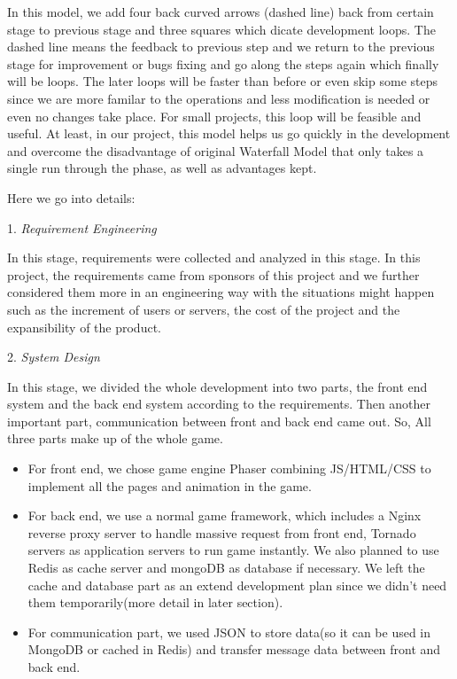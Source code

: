 \documentclass[a4paper,11pt]{article}
\begin{document}
In this model, we add four back curved arrows (dashed line) back from certain stage to previous stage and three squares which dicate development loops. The dashed line means the feedback to previous step and we return to the previous stage for improvement or bugs fixing and go along the steps again which finally will be loops. The later loops will be faster than before or even skip some steps since we are more familar to the operations and less modification is needed or even no changes take place. For small projects, this loop will be feasible and useful. At least, in our project, this model helps us go quickly in the development and overcome the disadvantage of original Waterfall Model that only takes a single run through the phase, as well as advantages kept.

 Here we go into details:

1.	\emph{Requirement Engineering}

In this stage, requirements were collected and analyzed in this stage. In this project, the requirements came from sponsors of this project and we further considered them more in an engineering way with the situations might happen such as the increment of users or servers, the cost of the project and the expansibility of the product.

2.	\emph{System Design}

In this stage, we divided the whole development into two parts, the front end system and the back end system according to the requirements. Then another important part, communication between front and back end came out. So, All three parts make up of the whole game.
	\begin{itemize}
	\item For front end, we chose game engine Phaser  combining JS/HTML/CSS to implement all the pages and animation in the game.
	\item For back end, we use a normal game framework, which includes a Nginx reverse proxy server to handle massive request from front end, Tornado servers as application servers to run game instantly. We also planned to use Redis as cache server and mongoDB as database if necessary. We left the cache and database part as an extend development plan since we didn't need them temporarily(more detail in later section).
	\item For communication part, we used JSON to store data(so it can be used in MongoDB or cached in Redis) and transfer message data between front and back end.
	\end{itemize}
\end{document}
